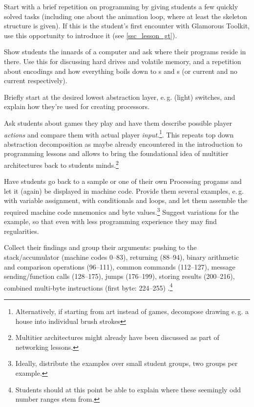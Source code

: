 \begin{instructions}
\item Start with a brief repetition on programming by giving students a few quickly solved tasks (including one about the animation loop, where at least the skeleton structure is given). If this is the student's first encounter with Glamorous Toolkit, use this opportunity to introduce it (see \ref{ssc_lesson_gt}).
\item Show students the innards of a computer and ask where their programs reside in there. Use this for discussing hard drives and volatile memory, and a repetition about encodings and how everything boils down to s and s (or current and no current respectively).
\item Briefly start at the desired lowest abstraction layer, e.\,g. (light) switches, and explain how they're used for creating processors.
\item Ask students about games they play and have them describe possible player \emph{actions} and compare them with actual player \emph{input}.\footnote{Alternatively, if starting from art instead of games, decompose drawing e.\,g. a house into individual brush strokes}. This repeats top down abstraction decomposition as maybe already encountered in the introduction to programming lessons and allows to bring the foundational idea of multitier architectures back to students minds.\footnote{Multitier architectures might already have been discussed as part of networking lessons.}
\item Have students go back to a sample or one of their own Processing progams and let it (again) be displayed in machine code. Provide them several examples, e.\,g. with variable assignment, with conditionals and loops, and let them assemble the required machine code mnemonics and byte values.\footnote{Ideally, distribute the examples over small student groups, two groups per example.} Suggest variations for the example, so that even with less programming experience they may find regularities.
\item Collect their findings and group their arguments: pushing to the stack/accumulator (machine codes 0--83), returning (88--94), binary arithmetic and comparison operations (96--111), common commands (112--127), message sending/function calls (128--175), jumps (176--199), storing results (200--216), combined multi-byte instructions (first byte: 224--255) \cite[p.\,12]{Ber14}.\footnote{Students should at this point be able to explain where these seemingly odd number ranges stem from.}

\end{instructions}

